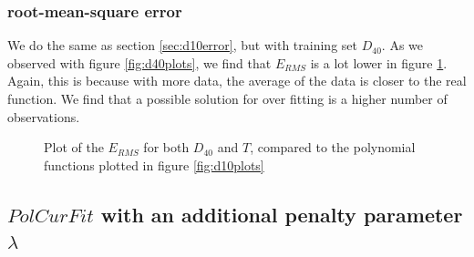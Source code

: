 \documentclass[11pt]{article}
\begin{document}
\subsubsection{root-mean-square error}
We do the same as section \ref{sec:d10error}, but with training set $D_{40}$. As we observed with figure \ref{fig:d40plots}, we find that $E_{RMS}$ is a lot lower in figure \ref{fig:d40error}. Again, this is because with more data, the average of the data is closer to the real function. We find that a possible solution for over fitting is a higher number of observations.

\begin{figure}[H]
\centering
	\centering
		
		\caption{Plot of the $E_{RMS}$ for both $D_{40}$ and $T$, compared to the polynomial functions plotted in figure \ref{fig:d10plots}}
	\label{fig:d40error}
\end{figure}

\subsection{$PolCurFit$ with an additional penalty parameter $\lambda$}
\end{document}
